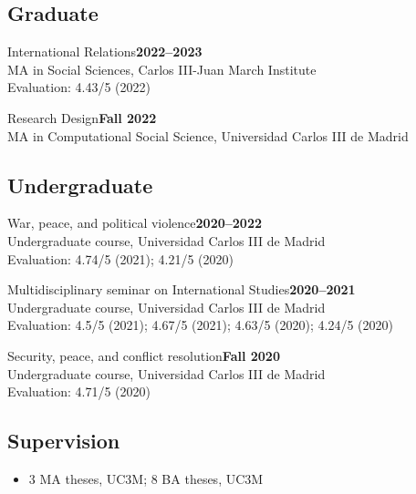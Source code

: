 \documentclass[a4paper, 12pt]{article}
\begin{document}
\subsection*{Graduate}

\noindent
International Relations\hfill\textbf{2022--2023}\\
{\small MA in Social Sciences, Carlos III-Juan March Institute}\\
{\small Evaluation: 4.43/5 (2022)}
\vspace{10pt}

\noindent
Research Design\hfill\textbf{Fall 2022}\\
{\small MA in Computational Social Science, Universidad Carlos III de Madrid}\\

\vspace{-10pt}
\subsection*{Undergraduate}

\noindent
War, peace, and political violence\hfill\textbf{2020--2022}\\
{\small Undergraduate course, Universidad Carlos III de Madrid}\\
{\small Evaluation: 4.74/5 (2021); 4.21/5 (2020)}
\vspace{10pt}

\noindent
Multidisciplinary seminar on International Studies\hfill\textbf{2020--2021}\\
{\small Undergraduate course, Universidad Carlos III de Madrid}\\
{\small Evaluation: 4.5/5 (2021); 4.67/5 (2021); 4.63/5 (2020); 4.24/5 (2020)}
\vspace{10pt}

\noindent
Security, peace, and conflict resolution\hfill\textbf{Fall 2020}\\
{\small Undergraduate course, Universidad Carlos III de Madrid}\\
{\small Evaluation: 4.71/5 (2020)}

\vspace{-10pt}
\subsection*{Supervision}

\begin{itemize}[leftmargin=*, nolistsep]
  \item 3 MA theses, UC3M; 8 BA theses, UC3M
\end{itemize}
\end{document}
